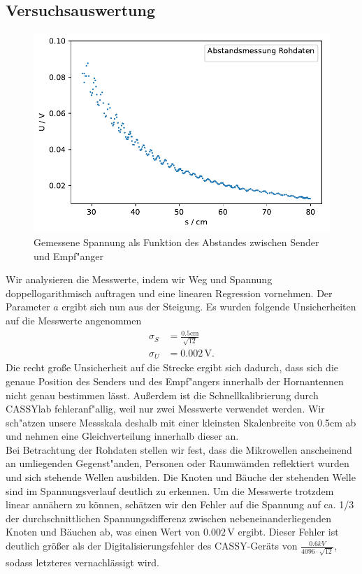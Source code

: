 \documentclass[12pt,a4paper]{article}
\begin{document}
\subsection{Versuchsauswertung}
\begin{figure}[H]
\centering
\includegraphics[scale=1]{Bilder/Abstandsabh_Rohdaten.pdf}
\caption{Gemessene Spannung als Funktion des Abstandes zwischen Sender und Empf"anger}
\end{figure}
Wir analysieren die Messwerte, indem wir Weg und Spannung doppellogarithmisch auftragen und eine linearen Regression vornehmen. Der Parameter $a$ ergibt sich nun aus der Steigung. Es wurden folgende Unsicherheiten auf die Messwerte angenommen
\begin{align}
\sigma_S &= \frac{0.5\text{cm}}{\sqrt{12}} \\
\sigma_U &= 0.002\,\text{V}.
\end{align}
Die recht gro\ss e Unsicherheit auf die Strecke ergibt sich dadurch, dass sich die genaue Position des Senders und des Empf"angers innerhalb der Hornantennen nicht genau bestimmen lässt. Au\ss erdem ist die Schnellkalibrierung durch CASSYlab fehleranf"allig, weil nur zwei Messwerte verwendet werden. Wir sch"atzen unsere Messskala deshalb mit einer kleinsten Skalenbreite von 0.5cm ab und nehmen eine Gleichverteilung innerhalb dieser an.\\
Bei Betrachtung der Rohdaten stellen wir fest, dass die Mikrowellen anscheinend an umliegenden Gegenst"anden, Personen oder Raumwämden reflektiert wurden und sich stehende Wellen ausbilden. Die Knoten und Bäuche der stehenden Welle sind im Spannungsverlauf deutlich zu erkennen. Um die Messwerte trotzdem linear annähern zu können, schätzen wir den Fehler auf die Spannung auf ca. 1/3 der durchschnittlichen Spannungsdifferenz zwischen nebeneinanderliegenden Knoten und Bäuchen ab, was einen Wert von $0.002\,\text{V}$ ergibt. Dieser Fehler ist deutlich größer als der Digitalisierungsfehler des CASSY-Geräts von $\frac{0.6 kV}{4096\cdot\sqrt{12}}$, sodass letzteres vernachlässigt wird.
\end{document}
